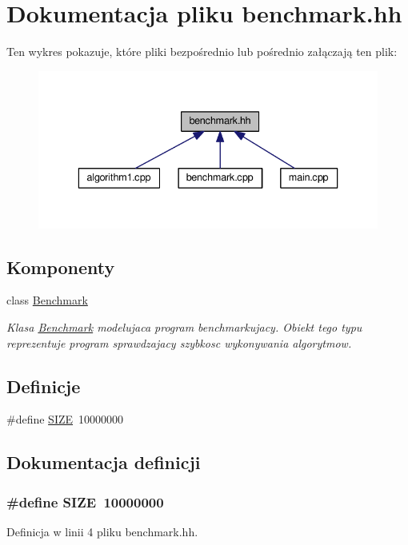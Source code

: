 \hypertarget{benchmark_8hh}{\section{Dokumentacja pliku benchmark.\-hh}
\label{benchmark_8hh}
}
Ten wykres pokazuje, które pliki bezpośrednio lub pośrednio załączają ten plik\-:\nopagebreak
\begin{figure}[H]
\begin{center}
\leavevmode
\includegraphics[width=336pt]{benchmark_8hh__dep__incl}
\end{center}
\end{figure}
\subsection*{Komponenty}
\begin{DoxyCompactItemize}
\item 
class \hyperlink{class_benchmark}{Benchmark}
\begin{DoxyCompactList}\small\item\em Klasa \hyperlink{class_benchmark}{Benchmark} modelujaca program benchmarkujacy. Obiekt tego typu reprezentuje program sprawdzajacy szybkosc wykonywania algorytmow. \end{DoxyCompactList}\end{DoxyCompactItemize}
\subsection*{Definicje}
\begin{DoxyCompactItemize}
\item 
\#define \hyperlink{benchmark_8hh_a70ed59adcb4159ac551058053e649640}{S\-I\-Z\-E}~10000000
\end{DoxyCompactItemize}


\subsection{Dokumentacja definicji}
\hypertarget{benchmark_8hh_a70ed59adcb4159ac551058053e649640}{
\subsubsection[{S\-I\-Z\-E}]{\setlength{\rightskip}{0pt plus 5cm}\#define S\-I\-Z\-E~10000000}}\label{benchmark_8hh_a70ed59adcb4159ac551058053e649640}


Definicja w linii 4 pliku benchmark.\-hh.

